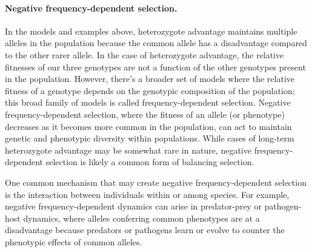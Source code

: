 {\paragraph{Negative frequency-dependent selection.}
In the models and examples above, heterozygote advantage maintains multiple alleles in the population because the common allele has a disadvantage compared to the
other rarer allele. In the case of heterozygote advantage, the
relative fitnesses of our three genotypes are not a function of the
other genotypes present in the population. However, there's a broader set of models where the relative fitness of a genotype depends on the
genotypic composition of the population; this broad family of models
is called frequency-dependent selection. Negative frequency-dependent selection, where the fitness of an allele
(or phenotype) decreases as it becomes more common in the population, can act to maintain genetic and phenotypic diversity within populations. While cases of long-term heterozygote advantage may be somewhat rare in nature, negative frequency-dependent selection is likely a common form of
balancing selection.

One common mechanism that may create negative frequency-dependent
selection is the interaction between individuals within or among
species. For example, negative frequency-dependent dynamics can
arise in predator-prey or pathogen-host dynamics, where
alleles conferring common phenotypes are at a disadvantage because 
predators or pathogens learn or evolve to counter the phenotypic effects of
common alleles.

}
